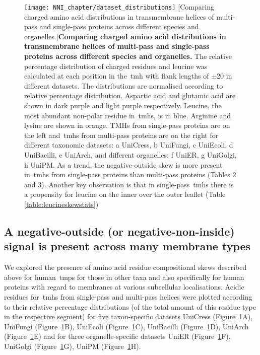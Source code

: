 \begin{figure}[!ht]
\centering
\texttt{[image: NNI\_chapter/dataset\_distributions]}
[Comparing charged amino acid distributions in transmembrane helices of multi\--pass and single\--pass proteins across different species and organelles.]{\textbf{Comparing charged amino acid distributions in transmembrane helices of multi\--pass and single\--pass proteins across different species and organelles.} The relative percentage distribution of charged residues and leucine was calculated at each position in the~\gls{tmh} with flank lengths of $\pm$20 in different datasets.
The distributions are normalised according to relative percentage distribution.
Aspartic acid and glutamic acid are shown in dark purple and light purple respectively.
Leucine, the most abundant non-polar residue in~\gls{tmh}s, is in blue.
Arginine and lysine are shown in orange.
TMHs from single\--pass proteins are on the left and~\gls{tmh}s from multi\--pass proteins are on the right for different taxonomic datasets: a UniCress, b UniFungi, c UniEcoli, d UniBacilli, e UniArch, and different organelles: f UniER, g UniGolgi, h UniPM.
As a trend, the negative-outside skew is more present in~\gls{tmh}s from single\--pass proteins than multi\--pass proteins (Tables 2 and 3).
Another key observation is that in single\--pass~\gls{tmh}s there is a propensity for leucine on the inner over the outer leaflet (Table \ref{table:leucineskewstats})}


\label{fig:dataset_distributions}
\end{figure}

\subsection{A negative-outside (or negative-non-inside) signal is present across many membrane types}

We explored the presence of amino acid residue compositional skews described above for human~\gls{tmp}s for those in other taxa and also specifically for human proteins with regard to membranes at various subcellular localisations.
Acidic residues for~\gls{tmh}s from single\--pass and multi\--pass helices were plotted according to their relative percentage distributions (of the total amount of this residue type in the respective segment) for five taxon-specific datasets UniCress (Figure~\ref{fig:dataset_distributions}A), UniFungi (Figure~\ref{fig:dataset_distributions}B), UniEcoli (Figure~\ref{fig:dataset_distributions}C), UniBacilli (Figure~\ref{fig:dataset_distributions}D), UniArch (Figure~\ref{fig:dataset_distributions}E) and for three organelle-specific datasets UniER (Figure~\ref{fig:dataset_distributions}F), UniGolgi (Figure~\ref{fig:dataset_distributions}G), UniPM (Figure~\ref{fig:dataset_distributions}H).

